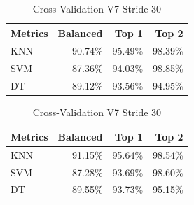 \documentclass[12pt,a4paper]{article}
\begin{document}
\begin{table}[H]
    \begin{minipage}{0.55\textwidth}
        \centering
        \caption{Cross-Validation V7 Stride 15}
        \label{table:6}
        \begin{tabular}{@{}lrrr@{}}
            \toprule
            Metrics & Balanced & Top 1   & Top 2   \\
            \midrule
            KNN     & 90.74\%  & 95.49\% & 98.39\% \\
            SVM     & 87.36\%  & 94.03\% & 98.85\% \\
            DT      & 89.12\%  & 93.56\% & 94.95\% \\
            \bottomrule
        \end{tabular}
    \end{minipage}
    \begin{minipage}{0.55\textwidth}
        \centering
        \caption{Cross-Validation V7 Stride 30}
        \label{table:7}
        \begin{tabular}{@{}lrrr@{}}
            \toprule
            Metrics & Balanced & Top 1   & Top 2   \\
            \midrule
            KNN     & 91.15\%  & 95.64\% & 98.54\% \\
            SVM     & 87.28\%  & 93.69\% & 98.60\% \\
            DT      & 89.55\%  & 93.73\% & 95.15\% \\
            \bottomrule
        \end{tabular}
    \end{minipage}
\end{table}
\end{document}
